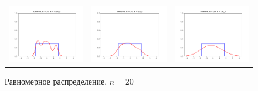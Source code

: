 	
	\begin{figure}[H]
		\centering
		\begin{tabular}{ccc}
			\includegraphics[width=55mm, height =0.25\textheight]{pics/ker_u_20_1.png}
			&
			\includegraphics[width=55mm, height =0.25\textheight]{pics/ker_u_20_2.png}
			&
			\includegraphics[width=55mm, height =0.25\textheight]{pics/ker_u_20_3.png}
		\end{tabular}
		\caption{Равномерное распределение, $n = 20$}
		\label{fig:uniform}
	\end{figure}


